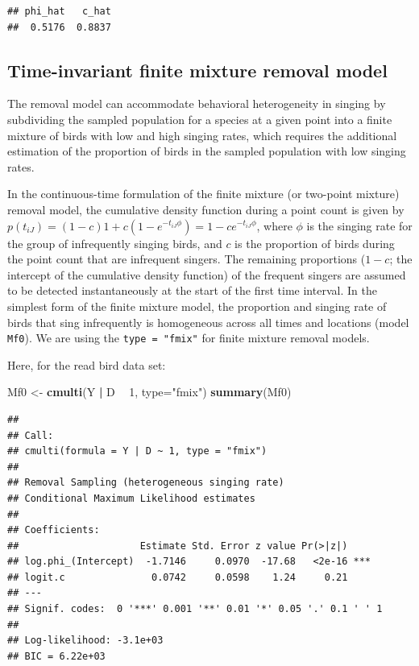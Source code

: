 \documentclass[12pt,]{book}
\newenvironment{Shaded}{\begin{snugshade}}{\end{snugshade}}
\newcommand{\DataTypeTok}[1]{\textcolor[rgb]{0.13,0.29,0.53}{#1}}
\newcommand{\DecValTok}[1]{\textcolor[rgb]{0.00,0.00,0.81}{#1}}
\newcommand{\KeywordTok}[1]{\textcolor[rgb]{0.13,0.29,0.53}{\textbf{#1}}}
\newcommand{\NormalTok}[1]{#1}
\newcommand{\OperatorTok}[1]{\textcolor[rgb]{0.81,0.36,0.00}{\textbf{#1}}}
\newcommand{\StringTok}[1]{\textcolor[rgb]{0.31,0.60,0.02}{#1}}
\begin{document}
\begin{verbatim}
## phi_hat   c_hat 
##  0.5176  0.8837
\end{verbatim}

\hypertarget{time-invariant-finite-mixture-removal-model}{%
\subsection{Time-invariant finite mixture removal model}\label{time-invariant-finite-mixture-removal-model}}

The removal model can accommodate behavioral heterogeneity in singing by subdividing the
sampled population for a species at a given point into a finite mixture of birds with low and
high singing rates, which requires the additional estimation of the proportion of birds in the
sampled population with low singing rates.

In the continuous-time formulation of the finite mixture (or two-point mixture) removal model,
the cumulative density function during a point count is given by
\(p(t_{iJ}) = (1 - c) 1 + c (1 - e^{-t_{iJ} \phi}) = 1 - c e^{-t_{iJ} \phi}\), where
\(\phi\) is the singing rate for the group of infrequently singing birds, and \(c\) is the
proportion of birds during the point count that are infrequent singers. The remaining
proportions (\(1 - c\); the intercept of the cumulative density function) of the frequent
singers are assumed to be detected instantaneously at the start of the first time interval.
In the simplest form of the finite mixture model, the proportion and singing rate of birds
that sing infrequently is homogeneous across all times and locations (model \texttt{Mf0}).
We are using the \texttt{type\ =\ "fmix"} for finite mixture removal models.

Here, for the read bird data set:

\begin{Shaded}
\begin{Highlighting}[]
\NormalTok{Mf0 <-}\StringTok{ }\KeywordTok{cmulti}\NormalTok{(Y }\OperatorTok{|}\StringTok{ }\NormalTok{D }\OperatorTok{~}\StringTok{ }\DecValTok{1}\NormalTok{, }\DataTypeTok{type=}\StringTok{"fmix"}\NormalTok{)}
\KeywordTok{summary}\NormalTok{(Mf0)}
\end{Highlighting}
\end{Shaded}

\begin{verbatim}
## 
## Call:
## cmulti(formula = Y | D ~ 1, type = "fmix")
## 
## Removal Sampling (heterogeneous singing rate)
## Conditional Maximum Likelihood estimates
## 
## Coefficients:
##                     Estimate Std. Error z value Pr(>|z|)    
## log.phi_(Intercept)  -1.7146     0.0970  -17.68   <2e-16 ***
## logit.c               0.0742     0.0598    1.24     0.21    
## ---
## Signif. codes:  0 '***' 0.001 '**' 0.01 '*' 0.05 '.' 0.1 ' ' 1 
## 
## Log-likelihood: -3.1e+03 
## BIC = 6.22e+03
\end{verbatim}
\end{document}
